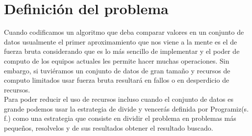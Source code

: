\section{Definición del problema}
Cuando codificamos un algoritmo que deba comparar valores en un conjunto de datos usualmente el primer aproximamiento que nos viene a la mente es el de fuerza bruta considerando que es lo más sencillo de implementar y el poder de computo de los equipos actuales les permite hacer muchas operaciones. Sin embargo, si tuviéramos un conjunto de datos de gran tamaño y recursos de computo limitados usar fuerza bruta resultará en fallos o en desperdicio de recursos.\\

Para poder reducir el uso de recursos incluso cuando el conjunto de datos es grande podemos usar la estrategia de divide y vencerás definida por Programiz(s. f.) como una estrategia  que consiste en dividir el problema en problemas más pequeños, resolvelos y de sus resultados obtener el resultado buscado.